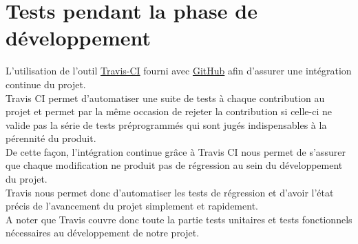 \section{Tests pendant la phase de développement}
L’utilisation de l'outil \href{https://travis-ci.org/}{Travis-CI} fourni avec \href{http://fr.wikipedia.org/wiki/GitHub}{GitHub} afin d'assurer une intégration continue du projet.\\
Travis CI permet d'automatiser une suite de tests à chaque contribution au projet et permet par la même occasion de rejeter la contribution si celle-ci ne valide pas la série de tests préprogrammés qui sont jugés indispensables à la pérennité du produit.\\
De cette façon, l'intégration continue grâce à Travis CI nous permet de s'assurer que chaque modification ne produit pas de régression au sein du développement du projet.\\
Travis nous permet donc d'automatiser les tests de régression et d'avoir l'état précis de l'avancement du projet simplement et rapidement.\\
A noter que Travis couvre donc toute la partie tests unitaires et tests fonctionnels nécessaires au développement de notre projet.\\

